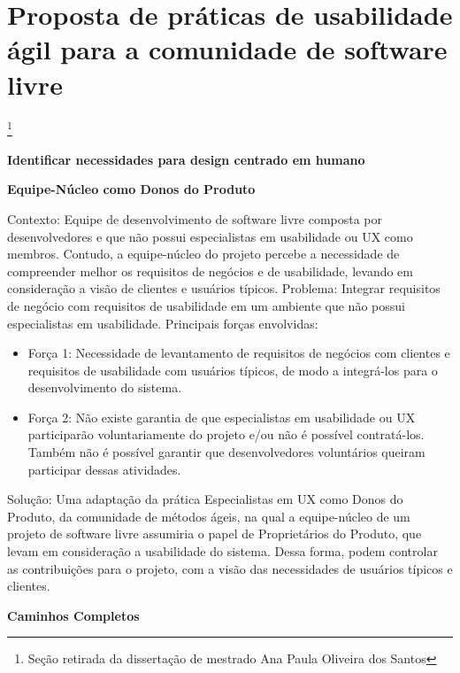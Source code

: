 \newpage
\section{Proposta de práticas de usabilidade ágil para a comunidade de software livre}\footnote{Seção retirada da dissertação de mestrado Ana Paula Oliveira dos Santos}
\label{ap-praticas-usabilidade}

\textbf{Identificar necessidades para design centrado em humano}

\textbf{Equipe-Núcleo como Donos do Produto}

Contexto: Equipe de desenvolvimento de software livre composta por desenvolvedores e que não possui especialistas em usabilidade ou UX como membros. Contudo, a equipe-núcleo do projeto percebe a necessidade de compreender melhor os requisitos de negócios e de usabilidade, levando em consideração a visão de clientes e usuários típicos.
Problema: Integrar requisitos de negócio com requisitos de usabilidade em um ambiente que não possui especialistas em usabilidade. Principais forças envolvidas:
\begin{itemize}
\item Força 1: Necessidade de levantamento de requisitos de negócios com clientes e requisitos de usabilidade com usuários típicos, de modo a integrá-los para o desenvolvimento do sistema.
\item Força 2: Não existe garantia de que especialistas em usabilidade ou UX participarão voluntariamente do projeto e/ou não é possível contratá-los. Também não é possível garantir que desenvolvedores voluntários queiram participar dessas atividades.
\end{itemize}
Solução: Uma adaptação da prática Especialistas em UX como Donos do Produto, da comunidade de métodos ágeis, na qual a equipe-núcleo de um projeto de software livre assumiria o papel de Proprietários do Produto, que levam em consideração a usabilidade do sistema. Dessa forma, podem controlar as contribuições para o projeto, com a visão das necessidades de usuários típicos e clientes.

%
\textbf{Caminhos Completos}

